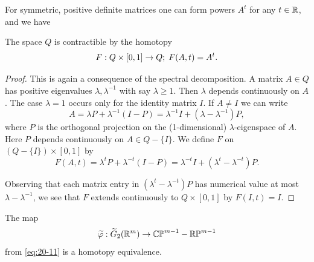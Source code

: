 For symmetric, positive definite matrices one can form powers ${A}^{t}$ for any $t \in  \mathbb{R}$, and we have

\begin{lemma}\label{lemma:20-5}
  The space $Q$ is contractible by the homotopy
  \[
    F:Q \times [0, 1] \rightarrow Q;\;F( {A,t})  = {A}^{t}.
  \]
\end{lemma}

\begin{proof}
  This is again a consequence of the spectral decomposition. A matrix $A \in  Q$ has positive 
  eigenvalues $\lambda,{\lambda }^{-1}$ with say $\lambda  \geq  1$. Then $\lambda$ depends 
  continuously on $A$. The case $\lambda  = 1$ occurs only for the identity matrix $I$. If $A \neq  I$ 
  we can write
  \[
    A = {\lambda P} + {\lambda }^{-1}( {I- P})  = {\lambda }^{-1}I + ( {\lambda - {\lambda }^{-1}}) P,
  \]
  where $P$ is the orthogonal projection on the (1-dimensional) $\lambda$-eigenspace of $A$. Here $P$ depends 
  continuously on $A \in  Q- \{ I\}$. We define $F$ on $( {Q-\{ I\} })  \times  [  {0,1}]$ by
  \[
    F( {A,t})  = {\lambda }^{t}P + {\lambda }^{-t}( {I- P})  = {\lambda }^{-t}I + ( {{\lambda }^{t}- {\lambda }^{-t}}) P.
  \]
  
  Observing that each matrix entry in $( {{\lambda }^{t}- {\lambda }^{-t}}) P$ has numerical value 
  at most $\lambda - {\lambda}^{-1}$, we see that $F$ extends continuously to $Q \times [0,1]$ 
  by $F( {I,t})  = I$.
\end{proof}


\begin{proposition}\label{proposition:20-6}
  The map
  \[
    \widetilde{\varphi } : \widetilde{G}_{2}( {{\mathbb{R}}^m})  \rightarrow  {\mathbb{CP}}^{m- 1}- \mathbb{RP}^{m- 1}
  \]
  from \eqref{eq:20-11} is a homotopy equivalence.
\end{proposition}

